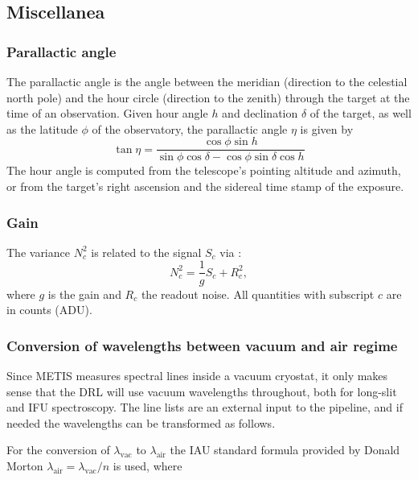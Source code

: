 \subsection{Miscellanea}
\label{ssec:miscellanea}

\subsubsection{Parallactic angle}
\label{sssec:parallactic_angle}

The parallactic angle is the angle between the meridian (direction to the celestial north pole) and the hour circle (direction to the zenith) through the target at the time of an observation. Given hour angle $h$ and declination $\delta$ of the target, as well as the latitude $\phi$ of the observatory, the parallactic angle $\eta$ is given by
\begin{equation}
  \label{eq:parallactic_angle}
  \tan\eta = \frac{\cos\phi\sin h}{\sin\phi \cos\delta - \cos\phi \sin\delta \cos h}
\end{equation}
The hour angle is computed from the telescope's pointing altitude and azimuth, or from the target's right ascension and the sidereal time stamp of the exposure.

\subsubsection{Gain}
\label{sssec:gain}

The variance $N_{c}^{2}$ is related to the signal $S_{c}$ via \cite[Section 9.1]{McLean2008}:
\begin{equation}
  \label{eq:signal-variance}
  N_{c}^{2} = \frac{1}{g} S_{c} + R_{c}^{2},
\end{equation}
where $g$ is the gain and $R_{c}$ the readout noise. All quantities with subscript $c$ are in counts (ADU).

\subsubsection{Conversion of wavelengths between vacuum and air regime}\label{ssec:vacair}

Since METIS measures spectral lines inside a vacuum cryostat, it only makes
sense that the DRL will use vacuum wavelengths throughout, both for long-slit
and IFU spectroscopy. The line lists are an external input to the pipeline, and
if needed the wavelengths can be transformed as follows.

For the conversion of $\lambda_\textrm{vac}$ to $\lambda_\textrm{air}$ the \ac{IAU} standard formula provided by Donald Morton \cite{mor00} $\lambda_\textrm{air}=\lambda_\textrm{vac}/n$ is used, where

